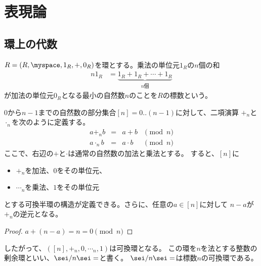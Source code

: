 \begingroup %
	\newcommand{\lu}[2]{\ensuremath{{}^{#1}\!{#2}}}
	\newcommand{\End}{\ensuremath{\myop{End}}}
	\newcommand{\Hom}{\ensuremath{\myop{Hom}}}
	\newcommand{\Tree}{\ensuremath{\mathcal{T}}}
	\newcommand{\treeu}{\ensuremath{1_\Tree}}
	\newcommand{\Forget}{\ensuremath{\mathcal{U}}}
	\newcommand{\Word}{\ensuremath{\mathcal{W}}}
	\newcommand{\wordu}{\ensuremath{1_{\Word}}}
	\newcommand{\word}[1]{\ensuremath{[{#1}]}}
	\newcommand{\push}{\ensuremath{\myop{push}}}
	\newcommand{\pop}{\ensuremath{\myop{pop}}}
	\newcommand{\Nothing}{\ensuremath{\myop{None}}}
	\newcommand{\none}{\ensuremath{\myop{none}}}
	\newcommand{\Maybe}{\ensuremath{\myop{Maybe}}}
	\newcommand{\onto}{\ensuremath{\myop{onto}}}
	\newcommand{\im}{\ensuremath{\myop{im}}}
	\newcommand{\lin}{\ensuremath{\myop{lin}}}
	\newcommand{\map}{\ensuremath{\myop{map}}}
	\newcommand{\defeq}{\ensuremath{\overset{\mathrm{def}}{=}}}
\section{表現論}\label{s1:表現論} %
\subsection{環上の代数}\label{s2:環上の代数} %
	\begin{definition}[環の標数]\label{def:環の標数} %
		$R=(R,\myspace,1_R,+,0_R)$を環とする。乗法の単位元$1_R$の$n$個の和
		\begin{equation*}\begin{split} %
			n1_R &= \underbrace{1_R+1_R+\cdots+1_R}_{n\text{個}}
		\end{split}\end{equation*} %
		が加法の単位元$0_R$となる最小の自然数$n$のことを$R$の標数という。
	\end{definition} %

	\begin{example}[整数の剰余環]\label{eg:整数の剰余環} %
		$0$から$n-1$までの自然数の部分集合$[n]=0..(n-1)$に対して、二項演算
		$+_n$と$\cdot_n$を次のように定義する。
		\begin{equation*}\begin{array}{rcll} %
			a +_n b &=& a + b & \pmod{n} \\
			a \cdot_n b &=& a\cdot b & \pmod{n}
		\end{array}\end{equation*} %
		ここで、右辺の$+$と$\cdot$は通常の自然数の加法と乗法とする。
		すると、$[n]$に
		\begin{itemize}\setlength{\itemsep}{-1mm} %
			\item $+_n$を加法、$0$をその単位元、
			\item $\cdots_n$を乗法、$1$をその単位元
		\end{itemize} %
		とする可換半環の構造が定義できる。さらに、任意の$a\in[n]$に対して
		$n-a$が$+_n$の逆元となる。
		\begin{proof} %
			$a+(n-a)=n=0\pmod{n}$
		\end{proof} %
		したがって、$([n],+_n,0,\cdots_n,1)$は可換環となる。
		この環を$n$を法とする整数の剰余環といい、$\sei/n\sei=$と書く。
		$\sei/n\sei=$は標数$n$の可換環である。
	\end{example} %

